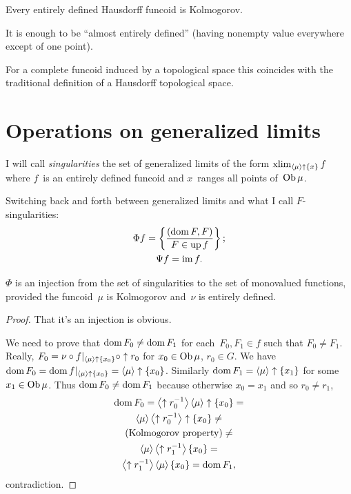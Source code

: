 \begin{cor}
Every entirely defined Hausdorff funcoid is Kolmogorov.
\end{cor}

\begin{rem}
It is enough to be ``almost entirely defined'' (having nonempty
value everywhere except of one point).
\end{rem}

\begin{obvious}
For a complete funcoid induced by a topological space this
coincides with the traditional definition of a Hausdorff
topological space.
\end{obvious}

\chapter{Operations on generalized limits}

I will call \emph{singularities} the set of generalized limits of the form $\operatorname{xlim}_{\left\langle \mu\right\rangle\uparrow\{x\}}f$ where $f$~is an entirely defined funcoid and $x$~ranges all points of~$\operatorname{Ob}\mu$.

Switching back and forth between generalized limits and what I call $F$-singularities:
\begin{gather*}
\Phi f =\left\{ \frac{(\operatorname{dom} F, F)}{F \in \operatorname{up} f}\right\};\\
\Psi f = \operatorname{im} f.
\end{gather*}

\begin{prop}
$\Phi$ is an injection from the set of singularities to the set of monovalued functions, provided the funcoid~$\mu$ is Kolmogorov and~$\nu$ is entirely defined.
\end{prop}

\begin{proof}
That it's an injection is obvious.

We need to prove that $\operatorname{dom} F_0\ne\operatorname{dom} F_1$ for each~$F_0,F_1\in f$ such that $F_0\ne F_1$.
Really, $F_0=\nu\circ f|_{\left\langle \mu\right\rangle\uparrow\{x_0\}}\circ\uparrow r_0$ for $x_0\in\operatorname{Ob}\mu$, $r_0\in G$.
We have $\operatorname{dom} F_0 = \operatorname{dom} f|_{\left\langle \mu\right\rangle\uparrow\{x_0\}}=\left\langle \mu\right\rangle\uparrow\{x_0\}$. Similarly $\operatorname{dom} F_1=\left\langle \mu\right\rangle\uparrow\{x_1\}$ for some $x_1\in\operatorname{Ob}\mu$.
Thus $\operatorname{dom} F_0\ne\operatorname{dom} F_1$ because otherwise $x_0=x_1$ and so $r_0\ne r_1$,
\begin{multline*}
\operatorname{dom} F_0=\left\langle \uparrow r_0^{-1}\right\rangle\left\langle \mu\right\rangle\uparrow\{x_0\}=\\\left\langle \mu\right\rangle\left\langle \uparrow r_0^{-1}\right\rangle\uparrow\{x_0\}\ne\\\text{(Kolmogorov property)}\ne\\\left\langle \mu\right\rangle\left\langle \uparrow r_1^{-1}\right\rangle\{x_0\}=\\\left\langle \uparrow r_1^{-1}\right\rangle\left\langle \mu\right\rangle\{x_0\}=\operatorname{dom} F_1,
\end{multline*}
contradiction.
\end{proof}

